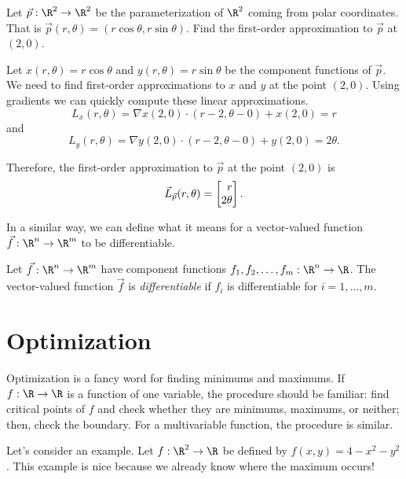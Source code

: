 \begin{example}
	Let $\vec p:\R^2\to\R^2$ be the parameterization of $\R^2$ coming from
	polar coordinates.  That is $\vec p(r,\theta) = (r\cos\theta,r\sin\theta)$.
	Find the first-order approximation to $\vec p$ at $(2,0)$.

	Let $x(r,\theta)=r\cos\theta$ and $y(r,\theta)=r\sin\theta$ be the component
	functions of $\vec p$.  We need to find first-order approximations to $x$ and $y$
	at the point $(2,0)$.  Using gradients we can quickly compute these linear
	approximations.
	\[
		L_x(r,\theta) = \nabla x(2,0)\cdot(r-2,\theta-0) + x(2,0)= r
	\]
	and
	\[
		L_y(r,\theta) = \nabla y(2,0)\cdot(r-2,\theta-0) + y(2,0)= 2\theta.
	\]

	Therefore, the first-order approximation to $\vec p$ at the point $(2,0)$ is
	\[
		\vec L_{\vec p}(r,\theta) = \mat{r\\2\theta}.
	\]
\end{example}

In a similar way, we can define what it means for a vector-valued function
$\vec f:\R^n\to\R^m$ to be differentiable.

\begin{definition}
	Let $\vec f:\R^n\to\R^m$ have component functions
	$f_1,f_2,\ldots,f_m:\R^n\to\R$.  The vector-valued function $\vec f$
	is \emph{differentiable} if $f_i$ is differentiable for
	$i=1,\ldots,m$.
\end{definition}

\section{Optimization}

Optimization is a fancy word for finding minimums and maximums.  If
$f:\R\to\R$ is a function of one variable, the procedure should be
familiar: find critical points of $f$ and check whether they are
minimums, maximums, or neither; then, check the boundary.  For
a multivariable function, the procedure is similar.

Let's consider an example.  Let $f:\R^2\to\R$ be defined by $f(x,y)=4-x^2-y^2$.
This example is nice because we already know where the maximum occurs!

\begin{center}
\end{center}

